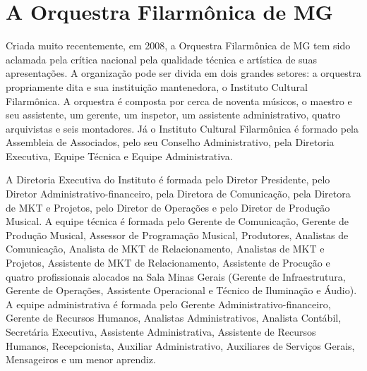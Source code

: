 \documentclass[a4paper, 12pt, openright, oneside, german, french, english, brazil]{abntex2}
\begin{document}

	
	
	
	
	
	
	
	
	
	
	
	
	\section{A Orquestra Filarmônica de MG}
	
	Criada muito recentemente, em 2008, a Orquestra Filarmônica de MG tem sido aclamada pela crítica nacional pela qualidade técnica e artística de suas apresentações. A organização pode ser divida em dois grandes setores: a orquestra propriamente dita e sua instituição mantenedora, o Instituto Cultural Filarmônica. A orquestra é composta por cerca de noventa músicos, o maestro e seu assistente, um gerente, um inspetor, um assistente administrativo, quatro arquivistas e seis montadores. Já o Instituto Cultural Filarmônica é formado pela Assembleia de Associados, pelo seu Conselho Administrativo, pela Diretoria Executiva, Equipe Técnica e Equipe Administrativa.
	
	A Diretoria Executiva do Instituto é formada pelo Diretor Presidente, pelo Diretor Administrativo-financeiro, pela Diretora de Comunicação, pela Diretora de MKT e Projetos, pelo Diretor de Operações e pelo Diretor de Produção Musical. A equipe técnica é formada pelo Gerente de Comunicação, Gerente de Produção Musical, Assessor de Programação Musical, Produtores, Analistas de Comunicação, Analista de MKT de Relacionamento, Analistas de MKT e Projetos, Assistente de MKT de Relacionamento, Assistente de Procução e quatro profissionais alocados na Sala Minas Gerais (Gerente de Infraestrutura, Gerente de Operações, Assistente Operacional e Técnico de Iluminação e Áudio). A equipe administrativa é formada pelo Gerente Administrativo-financeiro, Gerente de Recursos Humanos, Analistas Administrativos, Analista Contábil, Secretária Executiva, Assistente Administrativa, Assistente de Recursos Humanos, Recepcionista, Auxiliar Administrativo, Auxiliares de Serviços Gerais, Mensageiros e um menor aprendiz.
	
	
\end{document}
